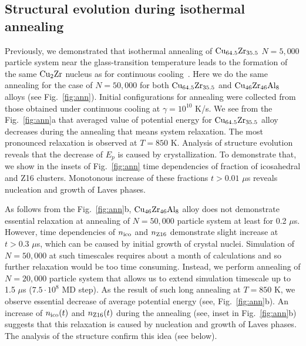\documentclass[jcp,twocolumn,superscriptaddress,floatfix,graphicx,showpacs]{revtex4-1}
\begin{document}
\subsection{Structural evolution during isothermal annealing}

Previously, we demonstrated that isothermal annealing of ${\rm Cu_{64.5}Zr_{35.5}}$ $N=5,000$ particle system near the glass-transition temperature leads to the formation of the same ${\rm Cu_2Zr}$ nucleus as for continuous cooling~\cite{Ryltsev2016JCP}. Here we do the same annealing for the case of $N=50,000$ for both ${\rm Cu_{64.5}Zr_{35.5}}$ and ${\rm Cu_{46}Zr_{46}Al_{8}}$ alloys (see Fig.~\ref{fig:ann}). Initial configurations for annealing were collected from those obtained under continuous cooling at $\gamma = 10^{10}$ K/s. We see from the Fig.~\ref{fig:ann}a that averaged value of potential energy for ${\rm Cu_{64.5}Zr_{35.5}}$ alloy decreases during the annealing that means system relaxation. The most pronounced relaxation is observed at $T=850$ K. Analysis of structure evolution reveals that the decrease of $E_p$ is caused by crystallization. To demonstrate that, we show in the insets of Fig.~\ref{fig:ann} time dependencies of fraction of icosahedral and Z16 clusters. Monotonous increase of these fractions $t > 0.01$ $\mu$s reveals nucleation and growth of Laves phases.

As follows from the Fig.~\ref{fig:ann}b, ${\rm Cu_{46}Zr_{46}Al_{8}}$ alloy does not demonstrate essential relaxation at annealing of $N=50,000$ particle system at least for 0.2 $\mu$s. However, time dependencies of $n_{\rm ico}$ and $n_{\rm Z16}$ demonstrate slight increase at $t> 0.3 $ $\mu$s, which can be caused by initial growth of crystal nuclei. Simulation of $N=50,000$ at such timescales requires about a month of calculations and so further relaxation would be too time consuming. Instead, we perform annealing of $N=20,000$ particle system that allows us to extend simulation timescale up to 1.5 $\mu$s ($7.5\cdot 10^8$ MD step). As the result of such long annealing at $T=850$ K, we observe essential decrease of average potential energy (see, Fig.~\ref{fig:ann}b). An increase of $n_{\rm ico}(t)$ and $n_{\rm Z16}(t)$ during the annealing (see, inset in Fig.~\ref{fig:ann}b) suggests that this relaxation is caused by nucleation and growth of Laves phases. The analysis of the structure confirm this idea (see below).
\end{document}
